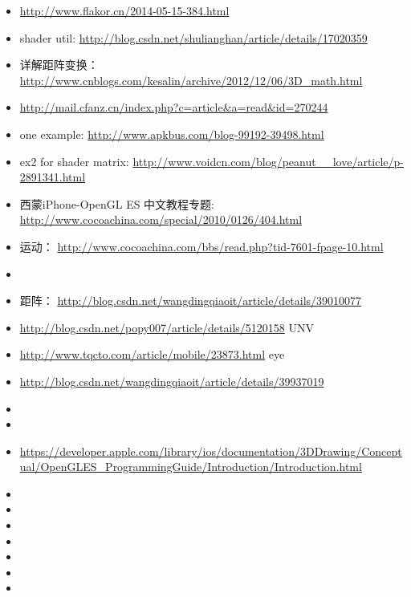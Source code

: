\documentclass[9pt,b5paper]{article}
\begin{document}
\begin{itemize}
\item \url{http://www.flakor.cn/2014-05-15-384.html}
\item shader util: \url{http://blog.csdn.net/shulianghan/article/details/17020359}
\item 详解距阵变换：\url{http://www.cnblogs.com/kesalin/archive/2012/12/06/3D_math.html}
\item \url{http://mail.cfanz.cn/index.php?c=article&a=read&id=270244}
\item one example: \url{http://www.apkbus.com/blog-99192-39498.html}
\item ex2 for shader matrix: \url{http://www.voidcn.com/blog/peanut__love/article/p-2891341.html}
\item 西蒙iPhone-OpenGL ES 中文教程专题: \url{http://www.cocoachina.com/special/2010/0126/404.html}
\item 运动： \url{http://www.cocoachina.com/bbs/read.php?tid-7601-fpage-10.html}
\item 
\item 距阵： \url{http://blog.csdn.net/wangdingqiaoit/article/details/39010077}
\item \url{http://blog.csdn.net/popy007/article/details/5120158} UNV
\item \url{http://www.tqcto.com/article/mobile/23873.html} eye
\item \url{http://blog.csdn.net/wangdingqiaoit/article/details/39937019}
\item 
\item 
\item \url{https://developer.apple.com/library/ios/documentation/3DDrawing/Conceptual/OpenGLES_ProgrammingGuide/Introduction/Introduction.html}
\item 
\item 
\item 
\item 
\item 
\item 
\item 
\end{itemize}
\end{document}
